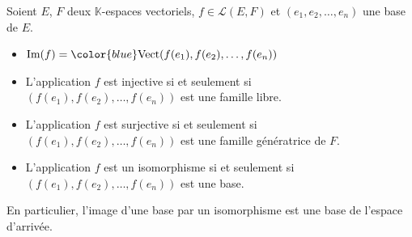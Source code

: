 \documentclass[french,11pt,twoside]{VcCours}
\renewcommand{\trou}[1]{{\color{blue}#1}}
\begin{document}
\begin{Theoreme}{} 
	Soient $E$, $F$ deux $\mathbb{K}$-espaces vectoriels, $f \in \mathcal{L}(E,F)$
	et $(e_1, e_2, \ldots, e_n)$ une base de $E$.
\begin{itemize}
\item $\textrm{Im}(f) = \trou{\textrm{Vect}(f(e_1), f(e_2), \ldots, f(e_n))}$
\item L'application $f$ est injective si et seulement si \\
		\trou{$(f(e_1), f(e_2), \ldots, f(e_n))$ est une famille libre.}
\item L'application $f$ est surjective si et seulement si \\
		\trou{$(f(e_1), f(e_2), \ldots, f(e_n))$ est une famille génératrice de $F$.}
\item L'application $f$ est un isomorphisme si et seulement si \\
		\trou{$(f(e_1), f(e_2), \ldots, f(e_n))$ est une base.}
\end{itemize}
\end{Theoreme}

\begin{Remarque}{} 
	En particulier, l'image d'une base par un isomorphisme est une base de 
	l'espace d'arrivée.
\end{Remarque}
\end{document}
